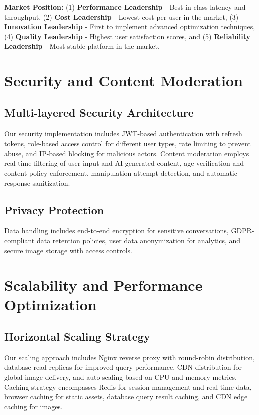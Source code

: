\documentclass[conference]{IEEEtran}
\begin{document}
\textbf{Market Position:} (1) \textbf{Performance Leadership} - Best-in-class latency and throughput, (2) \textbf{Cost Leadership} - Lowest cost per user in the market, (3) \textbf{Innovation Leadership} - First to implement advanced optimization techniques, (4) \textbf{Quality Leadership} - Highest user satisfaction scores, and (5) \textbf{Reliability Leadership} - Most stable platform in the market.

\section{Security and Content Moderation}

\subsection{Multi-layered Security Architecture}
Our security implementation includes JWT-based authentication with refresh tokens, role-based access control for different user types, rate limiting to prevent abuse, and IP-based blocking for malicious actors. Content moderation employs real-time filtering of user input and AI-generated content, age verification and content policy enforcement, manipulation attempt detection, and automatic response sanitization.

\subsection{Privacy Protection}
Data handling includes end-to-end encryption for sensitive conversations, GDPR-compliant data retention policies, user data anonymization for analytics, and secure image storage with access controls.

\section{Scalability and Performance Optimization}

\subsection{Horizontal Scaling Strategy}
Our scaling approach includes Nginx reverse proxy with round-robin distribution, database read replicas for improved query performance, CDN distribution for global image delivery, and auto-scaling based on CPU and memory metrics. Caching strategy encompasses Redis for session management and real-time data, browser caching for static assets, database query result caching, and CDN edge caching for images.
\end{document}

